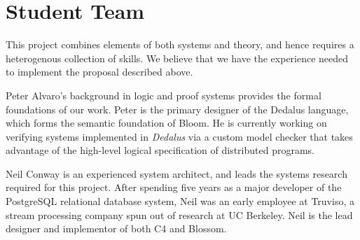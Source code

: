 \section{Student Team}
This project combines elements of both systems and theory, and hence requires a
heterogenous collection of skills. We believe that we have the experience needed
to implement the proposal described above.

Peter Alvaro's background in logic and proof systems provides the formal
foundations of our work.  Peter is the primary designer of the Dedalus language,
which forms the semantic foundation of Bloom.  He is currently working on
verifying systems implemented in \emph{Dedalus} via a custom model checker that
takes advantage of the high-level logical specification of distributed programs.

Neil Conway is an experienced system architect, and leads the systems research
required for this project. After spending five years as a major developer of the
PostgreSQL relational database system, Neil was an early employee at Truviso, a
stream processing company spun out of research at UC Berkeley. Neil is the lead
designer and implementor of both C4 and Blossom.
